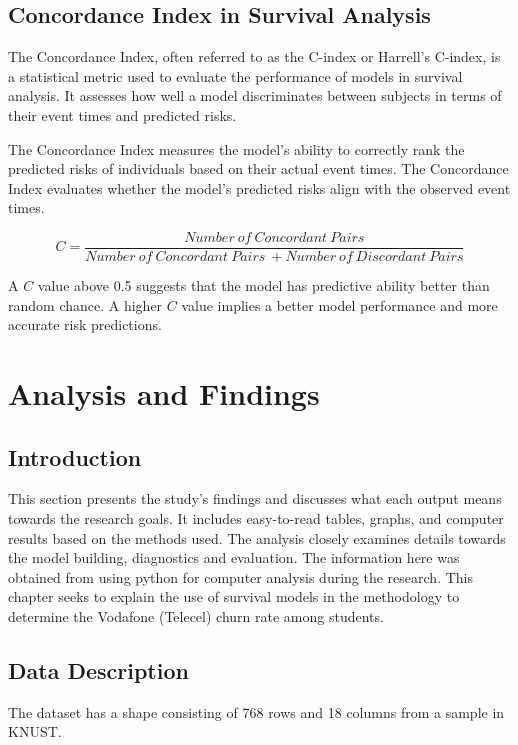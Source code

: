 \documentclass[12pt]{report} %
\begin{document}
\section{Concordance Index in Survival Analysis}

The Concordance Index, often referred to as the C-index or Harrell's C-index, is a statistical metric used to evaluate the performance of models in survival analysis. It assesses how well a model discriminates between subjects in terms of their event times and predicted risks. 

The Concordance Index measures the model's ability to correctly rank the predicted risks of individuals based on their actual event times. The Concordance Index evaluates whether the model's predicted risks align with the observed event times.

\[C=\frac{Number\ of\ Concordant\ Pairs}{Number\ of\ Concordant\ Pairs\ +Number\ of\ Discordant\ Pairs}\]

A \(C\) value above 0.5 suggests that the model has predictive ability better than random chance. A higher \(C\) value implies a better model performance and more accurate risk predictions.



\newpage
\chapter{Analysis and Findings}
\section{Introduction}

This section presents the study's findings and discusses what each output means towards the research goals. It includes easy-to-read tables, graphs, and computer results based on the methods used. The analysis closely examines details towards the model building, diagnostics and evaluation. The information here was obtained from using python for computer analysis during the research. This chapter seeks to explain the use of survival models in the methodology to determine the Vodafone (Telecel) churn rate among students.

\section{Data Description}

The dataset has a shape consisting of 768 rows and 18 columns from a sample in KNUST.
\end{document}
